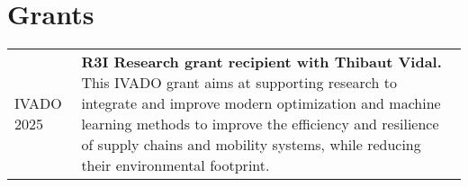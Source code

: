 \section{Grants}

\begin{longtable}[l]{@{}p{}p{}}
    IVADO 2025 & \textbf{R3I Research grant recipient with Thibaut Vidal.} This IVADO grant aims at supporting research to integrate and improve modern optimization and machine learning methods to improve the efficiency and resilience of supply chains and mobility systems, while reducing their environmental footprint.
\end{longtable}